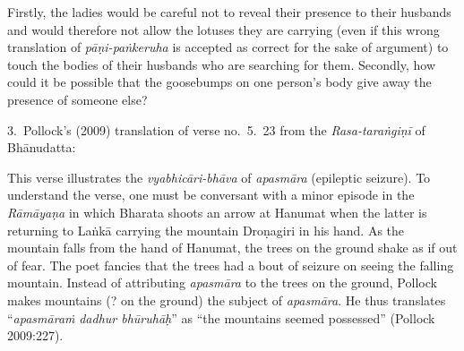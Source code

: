 Firstly, the ladies would be careful not to reveal their presence to their husbands and would therefore not allow the lotuses they are carrying (even if this wrong translation of \textsl{pāṇi-paṅkeruha} is accepted as correct for the sake of argument) to touch the bodies of their husbands who are searching for them. Secondly, how could it be possible that the goosebumps on one person's body give away the presence of someone else? 

3.~Pollock’s (2009) translation of verse no.\ 5.\ 23 from the \textsl{Rasa-taraṅgiṇī} of Bhānudatta: 

This verse illustrates the \textsl{vyabhicāri-bhāva} of \textsl{apasmāra} (epileptic seizure). To understand the verse, one must be conversant with a minor episode in the \textsl{Rāmāyaṇa} in which Bharata shoots an arrow at Hanumat when the latter is returning to Laṅkā carrying the mountain Droṇagiri in his hand. As the mountain falls from the hand of Hanumat, the trees on the ground shake as if out of fear. The poet fancies that the trees had a bout of seizure on seeing the falling mountain. Instead of attributing \textsl{apasmāra} to the trees on the ground, Pollock makes mountains (? on the ground) the subject of \textsl{apasmāra}. He thus translates “\textsl{apasmāraṁ} \textsl{dadhur bhūruhāḥ}” as “the mountains seemed possessed” (Pollock 2009:227). 

